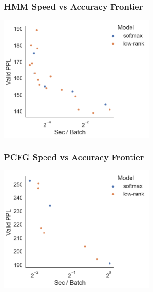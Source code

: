\documentclass{beamer}
\begin{document}
\begin{frame}
\frametitle{HMM Speed vs Accuracy Frontier}
\centering
\includegraphics[height=2.5in]{imgs/hmm/lhmm-speed-accuracy.png}
\end{frame}

\begin{frame}
\frametitle{PCFG Speed vs Accuracy Frontier}
\centering
\includegraphics[height=2.5in]{imgs/hmm/pcfg-speed-accuracy.png}
\end{frame}

\end{document}
